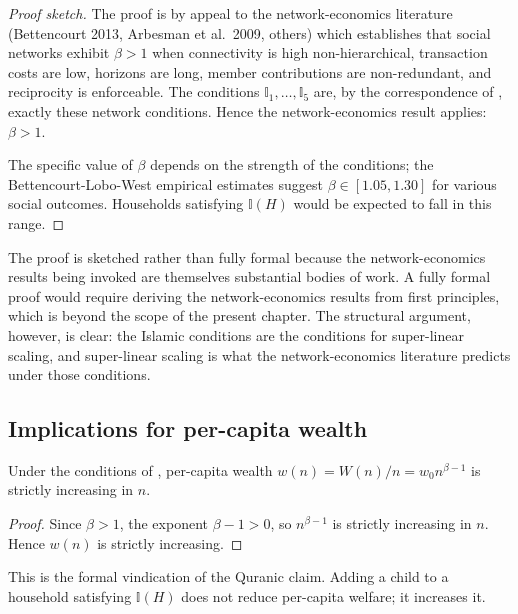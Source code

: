 \begin{proof}[Proof sketch]
The proof is by appeal to the network-economics literature
(Bettencourt 2013, Arbesman et al.\ 2009, others) which establishes
that social networks exhibit $\beta > 1$ when connectivity is high
non-hierarchical, transaction costs are low, horizons are long,
member contributions are non-redundant, and reciprocity is
enforceable. The conditions $\mathbb{I}_1, \dots, \mathbb{I}_5$
are, by the correspondence of ,
exactly these network conditions. Hence the network-economics
result applies: $\beta > 1$.

The specific value of $\beta$ depends on the strength of the
conditions; the Bettencourt-Lobo-West empirical estimates suggest
$\beta \in [1.05, 1.30]$ for various social outcomes. Households
satisfying $\mathbb{I}(H)$ would be expected to fall in this
range.
\end{proof}

The proof is sketched rather than fully formal because the network-economics
results being invoked are themselves substantial bodies of work. A
fully formal proof would require deriving the network-economics
results from first principles, which is beyond the scope of the
present chapter. The structural argument, however, is clear: the
Islamic conditions are the conditions for super-linear scaling, and
super-linear scaling is what the network-economics literature
predicts under those conditions.

\subsection{Implications for per-capita wealth}

\begin{corollary}
\label{cor:per-capita-increasing}
Under the conditions of , per-capita
wealth $w(n) = W(n)/n = w_0 n^{\beta - 1}$ is strictly increasing in
$n$.
\end{corollary}

\begin{proof}
Since $\beta > 1$, the exponent $\beta - 1 > 0$, so $n^{\beta - 1}$
is strictly increasing in $n$. Hence $w(n)$ is strictly increasing.
\end{proof}

This is the formal vindication of the Quranic claim. Adding a child
to a household satisfying $\mathbb{I}(H)$ does not reduce per-capita
welfare; it increases it.

